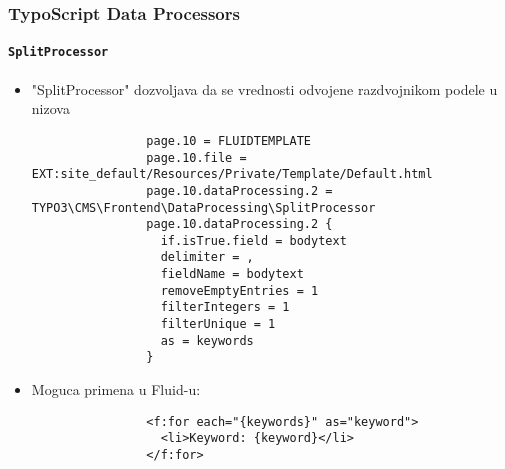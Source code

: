 \begin{frame}[fragile]
	\frametitle{TypoScript Data Processors}
	\framesubtitle{\texttt{SplitProcessor}}

	\lstset{basicstyle=\tiny\ttfamily}

	\begin{itemize}

		\item "SplitProcessor" dozvoljava da se vrednosti odvojene razdvojnikom podele u nizova

			\begin{lstlisting}
				page.10 = FLUIDTEMPLATE
				page.10.file = EXT:site_default/Resources/Private/Template/Default.html
				page.10.dataProcessing.2 = TYPO3\CMS\Frontend\DataProcessing\SplitProcessor
				page.10.dataProcessing.2 {
				  if.isTrue.field = bodytext
				  delimiter = ,
				  fieldName = bodytext
				  removeEmptyEntries = 1
				  filterIntegers = 1
				  filterUnique = 1
				  as = keywords
				}
			\end{lstlisting}

		\item Moguca primena u Fluid-u:

			\begin{lstlisting}
				<f:for each="{keywords}" as="keyword">
				  <li>Keyword: {keyword}</li>
				</f:for>
			\end{lstlisting}

	\end{itemize}

\end{frame}


